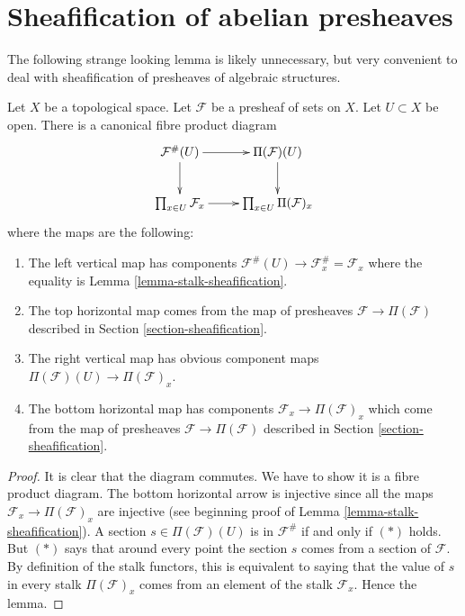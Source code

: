 \section{Sheafification of abelian presheaves}
\label{section-sheafify-abelian-presheaves}

\noindent
The following strange looking lemma is likely unnecessary, but
very convenient to deal with sheafification of presheaves
of algebraic structures.

\begin{lemma}
\label{lemma-diagram-fibre-product}
Let $X$ be a topological space. Let $\mathcal{F}$ be
a presheaf of sets on $X$. Let $U \subset X$ be open.
There is a canonical fibre product diagram
$$
\xymatrix{
\mathcal{F}^\#(U) \ar[d] \ar[r] &
\Pi(\mathcal{F})(U) \ar[d] \\
\prod_{x \in U} \mathcal{F}_x
\ar[r] &
\prod_{x \in U} \Pi(\mathcal{F})_x
}
$$
where the maps are the following:
\begin{enumerate}
\item The left vertical map has components
$\mathcal{F}^\#(U) \to \mathcal{F}^\#_x = \mathcal{F}_x$
where the equality is Lemma \ref{lemma-stalk-sheafification}.
\item The top horizontal map comes from the
map of presheaves $\mathcal{F} \to \Pi(\mathcal{F})$ described
in Section \ref{section-sheafification}.
\item The right vertical map has obvious component
maps $\Pi(\mathcal{F})(U) \to \Pi(\mathcal{F})_x$.
\item The bottom horizontal map has components
$\mathcal{F}_x \to \Pi(\mathcal{F})_x$
which come from the map of presheaves
$\mathcal{F} \to \Pi(\mathcal{F})$ described
in Section \ref{section-sheafification}.
\end{enumerate}
\end{lemma}

\begin{proof}
It is clear that the diagram commutes. We have to show
it is a fibre product diagram. The bottom horizontal arrow
is injective since all the maps $\mathcal{F}_x \to \Pi(\mathcal{F})_x$
are injective (see beginning proof of
Lemma \ref{lemma-stalk-sheafification}).
A section $s \in \Pi(\mathcal{F})(U)$ is in $\mathcal{F}^\#$ if and
only if $(*)$ holds. But $(*)$ says that around every point
the section $s$ comes from a section of $\mathcal{F}$. By definition
of the stalk functors, this is equivalent to saying that
the value of $s$ in every stalk $\Pi(\mathcal{F})_x$ comes
from an element of the stalk $\mathcal{F}_x$. Hence the lemma.
\end{proof}


